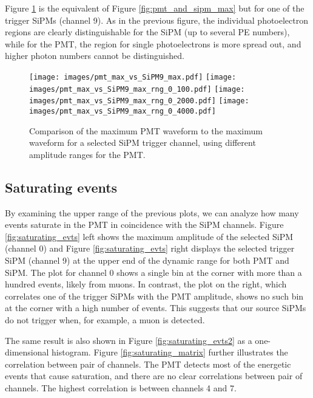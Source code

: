 \documentclass[11pt,a4paper,english,oneside, pdf]{article}
\begin{document}
	
	Figure \ref{fig:pmt_and_trigger_sipm_max} is the equivalent of Figure \ref{fig:pmt_and_sipm_max} but for one of the trigger SiPMs (channel 9). As in the previous figure, the individual photoelectron regions are clearly distinguishable for the SiPM (up to several PE numbers), while for the PMT, the region for single photoelectrons is more spread out, and higher photon numbers cannot be distinguished.
	
	\begin{figure}[!h]
		\begin{center}
			\texttt{[image: images/pmt\_max\_vs\_SiPM9\_max.pdf]}
			\texttt{[image: images/pmt\_max\_vs\_SiPM9\_max\_rng\_0\_100.pdf]}
			\texttt{[image: images/pmt\_max\_vs\_SiPM9\_max\_rng\_0\_2000.pdf]}
			\texttt{[image: images/pmt\_max\_vs\_SiPM9\_max\_rng\_0\_4000.pdf]}
			\caption{Comparison of the maximum PMT waveform to the maximum waveform for a selected SiPM trigger channel, using different amplitude ranges for the PMT.}
			\label{fig:pmt_and_trigger_sipm_max}
		\end{center}
	\end{figure}
	
	\subsection{Saturating events}
	
	By examining the upper range of the previous plots, we can analyze how many events saturate in the PMT in coincidence with the SiPM channels. Figure \ref{fig:saturating_evts} left shows the maximum amplitude of the selected SiPM (channel 0) and Figure \ref{fig:saturating_evts} right displays the selected trigger SiPM (channel 9) at the upper end of the dynamic range for both PMT and SiPM. The plot for channel 0 shows a single bin at the corner with more than a hundred events, likely from muons. In contrast, the plot on the right, which correlates one of the trigger SiPMs with the PMT amplitude, shows no such bin at the corner with a high number of events. This suggests that our source SiPMs do not trigger when, for example, a muon is detected.
	
	The same result is also shown in Figure \ref{fig:saturating_evts2} as a one-dimensional histogram. Figure \ref{fig:saturating_matrix} further illustrates the correlation between pair of channels. The PMT detects most of the energetic events that cause saturation, and there are no clear correlations between pair of channels. The highest correlation is between channels 4 and 7.
	
\end{document}

